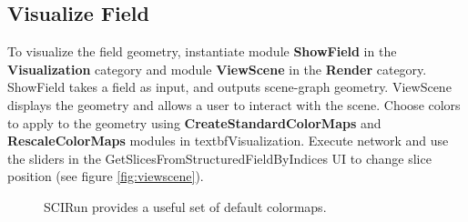 \documentclass[fleqn,11pt,openany]{book}
\begin{document}
\subsection{Visualize Field}\label{visualize}

To visualize the field geometry, instantiate module \textbf{ShowField}
in the \textbf{Visualization} category and module \textbf{ViewScene}
in the \textbf{Render} category.
ShowField takes a field as input, and outputs scene-graph geometry.
ViewScene displays the geometry and allows a user to interact with the scene.
Choose colors to apply to the geometry using \textbf{CreateStandardColorMaps}
and \textbf{RescaleColorMaps} modules in textbf{Visualization}.
Execute network and use the sliders in the GetSlicesFromStructuredFieldByIndices UI
to change slice position (see figure \ref{fig:viewscene}).

\begin{figure}[H]
\caption{SCIRun provides a useful set of default colormaps.}
\label{fig:colormap}
\end{figure}
\end{document}
